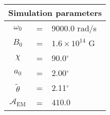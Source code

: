 \begin{tabular}{ccl}
\multicolumn{3}{c}{Simulation parameters} \\
\hline
$\omega_0$  &=& 9000.0 rad/s\\
$B_0$  &=& ${1.6}\times 10^{14}$ G \\
$\chi$  &=& 90.0$^{\circ}$ \\
$a_0$ &=& 2.00$^{\circ}$ \\
$\tilde{\theta}$ &= & 2.11$^{\circ}$ \\
$\mathcal{A}_{\mathrm{EM}}$ &= & $410.0$
\end{tabular}
